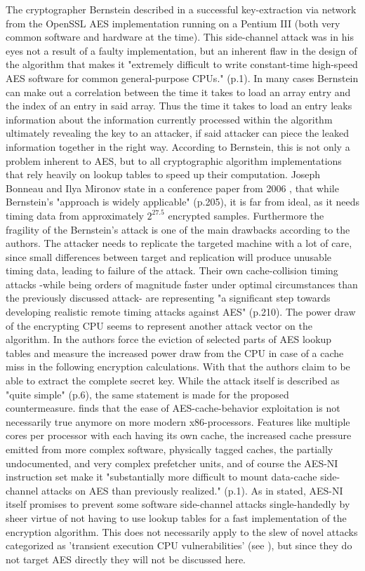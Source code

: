 The cryptographer Bernstein described in \cite{bernsteincache} a successful key-extraction via network from the OpenSSL AES implementation running on a Pentium III (both very common software and hardware at the time). This side-channel attack was in his eyes not a result of a faulty implementation, but an inherent flaw in the design of the algorithm that makes it "extremely difficult to write constant-time high-speed AES software for common general-purpose CPUs." (p.1). In many cases Bernstein can make out a correlation between the time it takes to load an array entry and the index of an entry in said array. Thus the time it takes to load an entry leaks information about the information currently processed within the algorithm ultimately revealing the key to an attacker, if said attacker can piece the leaked information together in the right way.
According to Bernstein, this is not only a problem inherent to AES, but to all cryptographic algorithm implementations that rely heavily on lookup tables to speed up their computation.
Joseph Bonneau and Ilya Mironov state in a conference paper from 2006  \cite{improvedcache}, that while Bernstein's "approach is widely applicable" (p.205), it is far from ideal, as it needs timing data from approximately $2^{27.5}$ encrypted samples. Furthermore the fragility of the Bernstein's attack is one of the main drawbacks according to the authors. The attacker needs to replicate the targeted machine with a lot of care, since small differences between target and replication will produce unusable timing data, leading to failure of the attack. Their own cache-collision timing attacks -while being orders of magnitude faster under optimal circumstances than the previously discussed attack- are representing "a significant step towards developing realistic remote timing attacks against AES" (p.210).
The power draw of the encrypting CPU seems to represent another attack vector on the algorithm. In \cite{powerdraw} the authors force the eviction of selected parts of AES lookup tables and measure the increased power draw from the CPU in case of a cache miss in the following encryption calculations. With that the authors claim to be able to extract the complete secret key. While the attack itself is described as "quite simple" (p.6), the same statement is made for the proposed countermeasure.
\cite{ctattacksfeasible} finds that the ease of AES-cache-behavior exploitation is not necessarily true anymore on more modern x86-processors. Features like multiple cores per processor with each having its own cache, the increased cache pressure emitted from more complex software, physically tagged caches, the partially undocumented, and very complex prefetcher units, and of course the AES-NI instruction set make it "substantially more difficult to mount data-cache side-channel attacks on AES than previously realized." (p.1). As in \cite{aes-ni} stated, AES-NI itself promises to prevent some software side-channel attacks single-handedly by sheer virtue of not having to use lookup tables for a fast implementation of the encryption algorithm.
This does not necessarily apply to the slew of novel attacks categorized as 'transient execution CPU vulnerabilities' (see \cite{transientexecution}), but since they do not target AES directly they will not be discussed here.

